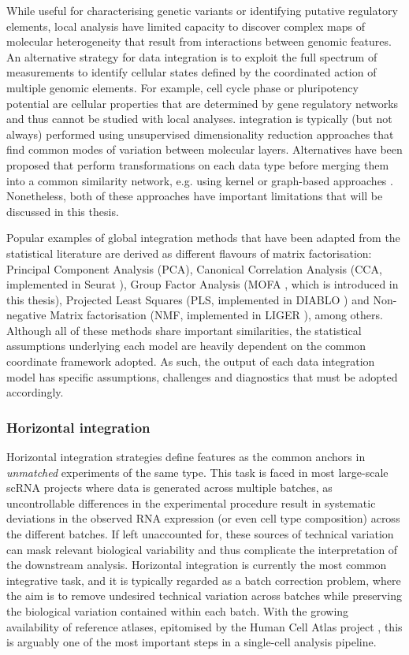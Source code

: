 While useful for characterising genetic variants or identifying putative regulatory elements, local analysis have limited capacity to discover complex maps of molecular heterogeneity that result from interactions between genomic features. An alternative strategy for data integration is to exploit the full spectrum of measurements to identify cellular states defined by the coordinated action of multiple genomic elements. For example, cell cycle phase or pluripotency potential are cellular properties that are determined by gene regulatory networks and thus cannot be studied with local analyses.  integration is typically (but not always) performed using unsupervised dimensionality reduction approaches that find common modes of variation between molecular layers. Alternatives have been proposed that perform transformations on each data type before merging them into a common similarity network, e.g. using kernel or graph-based approaches \cite{Lanckriet2004, Wang2014}. Nonetheless, both of these approaches have important limitations that will be discussed in this thesis.

Popular examples of global integration methods that have been adapted from the statistical literature are derived as different flavours of matrix factorisation: Principal Component Analysis (PCA), Canonical Correlation Analysis (CCA, implemented in Seurat \cite{Butler2018}), Group Factor Analysis (MOFA \cite{Argelaguet2018,Argelaguet2019}, which is introduced in this thesis), Projected Least Squares (PLS, implemented in DIABLO \cite{Singh2018}) and Non-negative Matrix factorisation (NMF, implemented in LIGER \cite{Welch2019}), among others. Although all of these methods share important similarities, the statistical assumptions underlying each model are heavily dependent on the common coordinate framework adopted. As such, the output of each data integration model has specific assumptions, challenges and diagnostics that must be adopted accordingly.

\subsubsection{Horizontal integration}

Horizontal integration strategies define features as the common anchors in \textit{unmatched} experiments of the same type. This task is faced in most large-scale scRNA projects where data is generated across multiple batches, as uncontrollable differences in the experimental procedure result in systematic deviations in the observed RNA expression (or even cell type composition) across the different batches. If left unaccounted for, these sources of technical variation can mask relevant biological variability and thus complicate the interpretation of the downstream analysis. Horizontal integration is currently the most common integrative task, and it is typically regarded as a batch correction problem, where the aim is to remove undesired technical variation across batches while preserving the biological variation contained within each batch. With the growing availability of reference atlases, epitomised by the Human Cell Atlas project \cite{Aviv2017}, this is arguably one of the most important steps in a single-cell analysis pipeline. 

